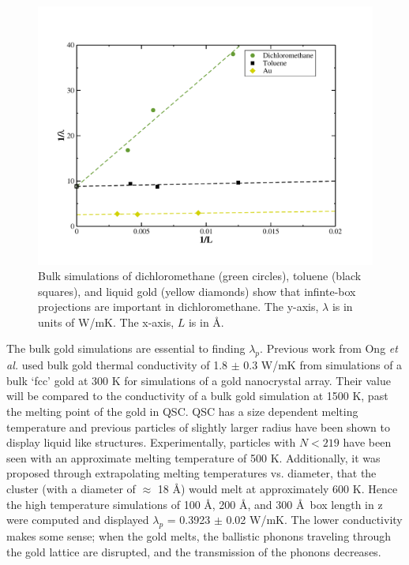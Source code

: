 \begin{figure}[h]
    \includegraphics[scale=0.5]{figures/inverselambda-solvent.pdf}
    \caption{ Bulk simulations of dichloromethane (green circles), toluene (black squares), and liquid gold (yellow diamonds) show that infinte-box projections are important in dichloromethane. The y-axis, $\lambda$ is in units of W/mK. The x-axis, $L$ is in \AA.}
    \label{fig:inverselambda}
\end{figure}


The bulk gold simulations are essential to finding $\lambda_p$. Previous work from Ong \textit{et al.}\cite{Ong:2014yq} used bulk gold thermal conductivity of 1.8 $\pm$ 0.3 W/mK from simulations of a bulk `fcc' gold at 300 K for simulations of a gold nanocrystal array.
Their value will be compared to the conductivity of a bulk gold simulation at 1500 K, past the melting point of the gold in QSC.
QSC has a size dependent melting temperature and previous particles of slightly larger radius have been shown to display liquid like structures.\cite{Stocker2016}
Experimentally, particles with $N<219$ have been seen with an approximate melting temperature of 500 K.\cite{Ercolessi1991}
Additionally, it was proposed through extrapolating melting temperatures vs. diameter, that the  cluster (with a diameter of $\approx$ 18 \AA) would melt at approximately 600 K.\cite{Buffat1976}
Hence the high temperature simulations of 100 \AA, 200 \AA, and 300 \AA\ box length in z were computed and displayed $\lambda_p$ = 0.3923 $\pm$ 0.02 W/mK.
The lower conductivity makes some sense; when the gold melts, the ballistic phonons traveling through the gold lattice are disrupted, and the transmission of the phonons decreases.

